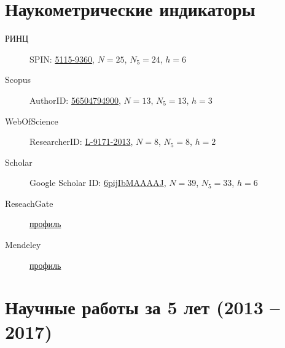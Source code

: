 \documentclass[a4paper,12pt]{article}
\begin{document}
	\sloppy
	\renewcommand{\refname}{}
	
	\section*{Наукометрические индикаторы}
	\begin{description}
		\item [РИНЦ] SPIN: \href{http://elibrary.ru/author_profile.asp?authorid=724544}{5115-9360}, $N=25$, $N_5=24$, $h=6$
		
		\item [Scopus] AuthorID: \href{https://www.scopus.com/authid/detail.uri?authorId=56504794900}{56504794900}, $N=13$, $N_5=13$, $h=3$
		
		\item[WebOfScience] ResearcherID: \href{http://www.researcherid.com/rid/L-9171-2013}{L-9171-2013}, $N=8$, $N_5=8$, $h=2$
		
		\item[Scholar] Google Scholar ID: \href{https://scholar.google.ru/citations?user=6pijIbMAAAAJ&hl=ru}{6pijIbMAAAAJ}, $N=39$, $N_5=33$, $h=6$
		
		\item[ReseachGate] \href{https://www.researchgate.net/profile/Alexandr_Panov2}{профиль}
		
		\item[Mendeley] \href{https://www.mendeley.com/profiles/aleksandr-panov6/}{профиль}
		
	\end{description}

	\section*{Научные работы за 5 лет (2013 -- 2017)}
	\nocite{*}

	\begin{refsection}
		\nocite{*}
		\printbibliography[title={Статьи в рецензируемых журналах}, heading=subbibliography, keyword={mypub},check=recent]
		\printbibliography[title={Статьи на конференциях}, heading=subbibliography, keyword={myconf},check=recent]
		\printbibliography[title={Тезисы выступлений}, heading=subbibliography, keyword={myth},check=recent]
		\printbibliography[title={Переводные версии статей}, heading=subbibliography, keyword={mypubtr},check=recent, resetnumbers=true]
		\printbibliography[title={Книги и монографии}, heading=subbibliography, keyword={mybook},check=recent, resetnumbers=true]
	\end{refsection}
\end{document}
